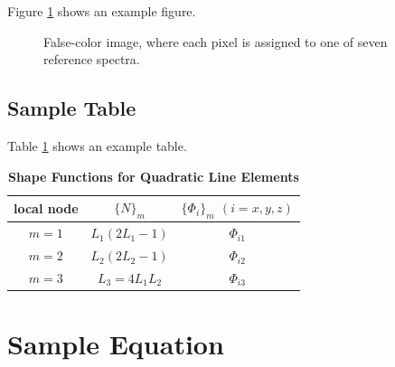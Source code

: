 \documentclass[9pt,twocolumn,twoside]{osajnl}
\begin{document}
Figure \ref{fig:false-color} shows an example figure.

\begin{figure}[htbp]
\centering
{}
\caption{False-color image, where each pixel is assigned to one of seven reference spectra.}
\label{fig:false-color}
\end{figure}

\subsection{Sample Table}

Table \ref{tab:shape-functions} shows an example table.

\begin{table}[htbp]
\centering
\caption{\bf Shape Functions for Quadratic Line Elements}
\begin{tabular}{ccc}
\hline
local node & $\{N\}_m$ & $\{\Phi_i\}_m$ $(i=x,y,z)$ \\
\hline
$m = 1$ & $L_1(2L_1-1)$ & $\Phi_{i1}$ \\
$m = 2$ & $L_2(2L_2-1)$ & $\Phi_{i2}$ \\
$m = 3$ & $L_3=4L_1L_2$ & $\Phi_{i3}$ \\
\hline
\end{tabular}
  \label{tab:shape-functions}
\end{table}

\section{Sample Equation}
\end{document}
